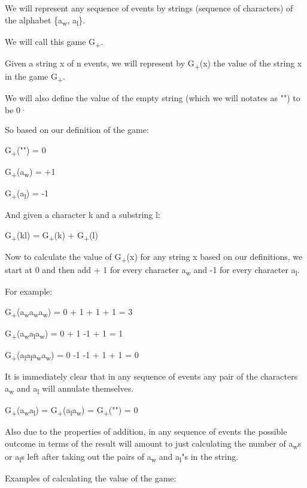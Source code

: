 \documentclass[12pt,reqno]{amsart}
\begin{document}
We will represent any sequence of events by strings (sequence of characters) of the alphabet \{a\textsubscript{w}, a\textsubscript{l}\}. 

We will call this game G\textsubscript{+}.

Given a string x of n events, we will represent by G\textsubscript{+}(x) the value of the string x in the game G\textsubscript{+}.

We will also define the value of the empty string (which we will notates as "") to be 0·

So based on our definition of the game:

G\textsubscript{+}("") = 0

G\textsubscript{+}(a\textsubscript{w}) = +1

G\textsubscript{+}(a\textsubscript{l}) = -1

And given a character k and a substring l:

G\textsubscript{+}(kl) = G\textsubscript{+}(k) + G\textsubscript{+}(l)

Now to calculate the value of G\textsubscript{+}(x) for any string x based on our definitions, we start at 0 and then add + 1 for every character a\textsubscript{w} and -1 for every character a\textsubscript{l}.

For example:

G\textsubscript{+}(a\textsubscript{w}a\textsubscript{w}a\textsubscript{w}) = 0 + 1 + 1 + 1 = 3

G\textsubscript{+}(a\textsubscript{w}a\textsubscript{l}a\textsubscript{w}) = 0 + 1 -1 + 1 = 1

G\textsubscript{+}(a\textsubscript{l}a\textsubscript{l}a\textsubscript{w}a\textsubscript{w}) = 0 -1 -1 + 1 + 1 = 0


It is immediately clear that in any sequence of events any pair of the characters a\textsubscript{w} and a\textsubscript{l} will annulate themselves. 

G\textsubscript{+}(a\textsubscript{w}a\textsubscript{l}) = G\textsubscript{+}(a\textsubscript{l}a\textsubscript{w}) = G\textsubscript{+}("") = 0


Also due to the properties of addition, in any sequence of events the possible outcome in terms of the result will amount to just calculating the number of a\textsubscript{w}s or a\textsubscript{l}s left after taking out the pairs of a\textsubscript{w} and a\textsubscript{l}"s in the string.

Examples of calculating the value of the game: 
\end{document}
